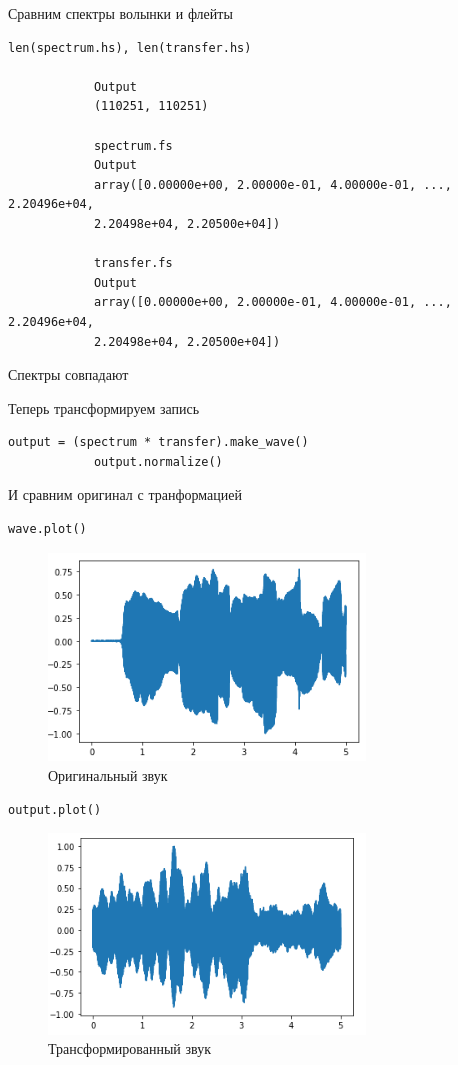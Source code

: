 \documentclass[a4paper,12pt]{article}
\begin{document}
\begin{enumerate}
		Сравним спектры волынки и флейты
		\begin{lstlisting}[caption=Сравниваем спектры]
			len(spectrum.hs), len(transfer.hs)
			
			Output
			(110251, 110251)
			
			spectrum.fs
			Output
			array([0.00000e+00, 2.00000e-01, 4.00000e-01, ..., 2.20496e+04,
			2.20498e+04, 2.20500e+04])
			
			transfer.fs
			Output
			array([0.00000e+00, 2.00000e-01, 4.00000e-01, ..., 2.20496e+04,
			2.20498e+04, 2.20500e+04])
		\end{lstlisting}
	
		Спектры совпадают
		
		Теперь трансформируем запись
		\begin{lstlisting}[caption=Траснформация записи]
			output = (spectrum * transfer).make_wave()
			output.normalize()
		\end{lstlisting}
		
		И сравним оригинал с транформацией
		\begin{lstlisting}[caption=Оригинальный звук]
			wave.plot()
		\end{lstlisting}
		\begin{figure}[H]
			\centering
			\includegraphics[width=0.75\textwidth]{2_5.png}
			\caption{Оригинальный звук}
			\label{fig:2.5}
		\end{figure}
		\begin{lstlisting}[caption=Трансформированный звук]
			output.plot()
		\end{lstlisting}
		\begin{figure}[H]
			\centering
			\includegraphics[width=0.75\textwidth]{2_6.png}
			\caption{Трансформированный звук}
			\label{fig:2.6}
		\end{figure}
	

\end{enumerate}
\end{document}
